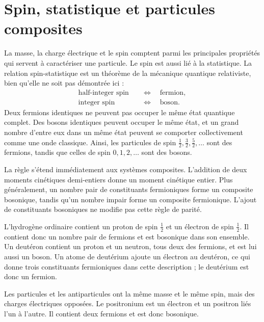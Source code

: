 \section{Spin, statistique et particules composites}

La masse, la charge électrique et le spin comptent parmi les principales propriétés qui servent à caractériser une particule. Le spin est aussi lié à la statistique. La relation spin-statistique est un théorème de la mécanique quantique relativiste, bien qu’elle ne soit pas démontrée ici :
\begin{equation}
\begin{aligned}
\text{half-integer spin} &\quad\Longleftrightarrow\quad \text{fermion},\\
\text{integer spin} &\quad\Longleftrightarrow\quad \text{boson}.
\end{aligned}
\end{equation}
Deux fermions identiques ne peuvent pas occuper le même état quantique complet. Des bosons identiques peuvent occuper le même état, et un grand nombre d’entre eux dans un même état peuvent se comporter collectivement comme une onde classique. Ainsi, les particules de spin \(\tfrac12,\tfrac32,\tfrac52,\ldots\) sont des fermions, tandis que celles de spin \(0,1,2,\ldots\) sont des bosons.

La règle s’étend immédiatement aux systèmes composites. L’addition de deux moments cinétiques demi-entiers donne un moment cinétique entier. Plus généralement, un nombre pair de constituants fermioniques forme un composite bosonique, tandis qu’un nombre impair forme un composite fermionique. L’ajout de constituants bosoniques ne modifie pas cette règle de parité.

L’hydrogène ordinaire contient un proton de spin \(\tfrac12\) et un électron de spin \(\tfrac12\). Il contient donc un nombre pair de fermions et est bosonique dans son ensemble. Un deutéron contient un proton et un neutron, tous deux des fermions, et est lui aussi un boson. Un atome de deutérium ajoute un électron au deutéron, ce qui donne trois constituants fermioniques dans cette description ; le deutérium est donc un fermion.

Les particules et les antiparticules ont la même masse et le même spin, mais des charges électriques opposées. Le positronium est un électron et un positron liés l’un à l’autre. Il contient deux fermions et est donc bosonique.

